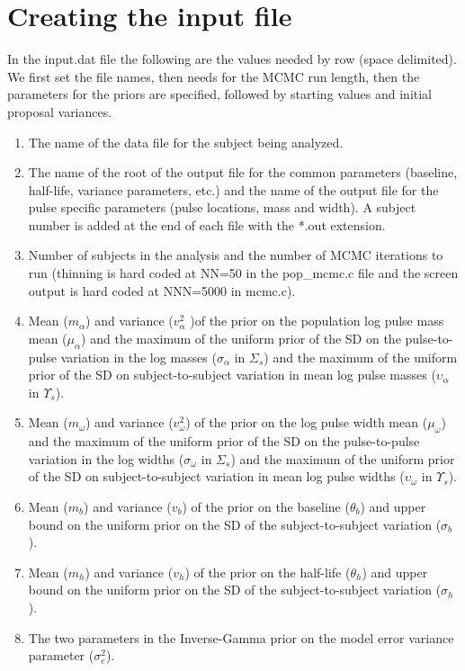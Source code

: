 \documentclass[12pt, oneside]{article}   	%
\begin{document}
\section{Creating the input file}
In the input.dat file the following are the values needed by row (space delimited). We first set the file names, then needs for the MCMC run length, then the parameters for the priors are specified, followed by starting values and initial proposal variances.
\begin{enumerate}
\item The name of the data file for the subject being analyzed.
\item The name of the root of the output file for the common parameters (baseline, half-life, variance parameters, etc.) and the name of the output file for the pulse specific parameters (pulse locations, mass and width). A subject number is added at the end of each file with the *.out extension.
\item Number of subjects in the analysis and the number of MCMC iterations to run (thinning is hard coded at NN=50 in the pop\_mcmc.c file and the screen output is hard coded at NNN=5000 in mcmc.c).
\item Mean ($m_\alpha$) and variance ($v_\alpha^2$ )of the prior on the population log pulse mass mean ($\mu_\alpha$) and the maximum of the uniform prior of the SD on the pulse-to-pulse variation in the log masses ($\sigma_\alpha$ in $\Sigma_s$) and the maximum of the uniform prior of the SD on subject-to-subject variation in mean log pulse masses ($\upsilon_\alpha$ in $\Upsilon_s$).
\item Mean ($m_\omega$) and variance ($v_\omega^2$) of the prior on the log pulse width mean ($\mu_\omega$) and the maximum of the uniform prior of the SD on the pulse-to-pulse variation in the log widths ($\sigma_\omega$ in $\Sigma_s$) and the maximum of the uniform prior of the SD on subject-to-subject variation in mean log pulse widths ($\upsilon_\omega$ in $\Upsilon_s$).
\item Mean ($m_b$) and variance ($v_b$) of the prior on the baseline ($\theta_b$) and upper bound on the uniform prior on the SD of the subject-to-subject variation ($\sigma_b$).
\item Mean ($m_h$) and variance ($v_h$) of the prior on the half-life ($\theta_h$) and upper bound on the uniform prior on the SD of the subject-to-subject variation ($\sigma_h$).
\item The two parameters in the Inverse-Gamma prior on the model error variance parameter ($\sigma_e^2$).

\end{enumerate}
\end{document}
